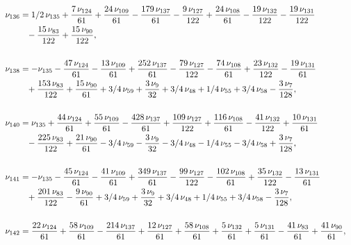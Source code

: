 \documentclass[a4paper,12pt, DIV=14, BCOR=5mm, twoside, headsepline, numbers=noenddot]{scrbook}
\begin{document}
\begin{align}
\begin{aligned}
\\
\nu_{{136}}&=1/2\,\nu_{{135}}+{
\frac {7\,\nu_{{124}}}{61}}+{\frac {24\,\nu_{{109}}}{61}}-{\frac {179
\,\nu_{{137}}}{61}}-{\frac {9\,\nu_{{127}}}{122}}+{\frac {24\,\nu_{{
108}}}{61}}-{\frac {19\,\nu_{{132}}}{122}}-{\frac {19\,\nu_{{131}}}{
122}}\\
 &\hphantom{=}-{\frac {15\,\nu_{{83}}}{122}}+{\frac {15\,\nu_{{90}}}{122}}, \\
\\
\nu_
{{138}}&=-\nu_{{135}}-{\frac {47\,\nu_{{124}}}{61}}-{\frac {13\,\nu_{{
109}}}{61}}+{\frac {252\,\nu_{{137}}}{61}}-{\frac {79\,\nu_{{127}}}{
122}}-{\frac {74\,\nu_{{108}}}{61}}+{\frac {23\,\nu_{{132}}}{122}}-{
\frac {19\,\nu_{{131}}}{61}}\\
 &\hphantom{=}+{\frac {153\,\nu_{{83}}}{122}}+{\frac {15
\,\nu_{{90}}}{61}}+3/4\,\nu_{{59}}+{\frac {3\,\nu_{{9}}}{32}}+3/4\,\nu
_{{48}}+1/4\,\nu_{{55}}+3/4\,\nu_{{58}}-{\frac {3\,\nu_{{7}}}{128}},\\
\\
\nu_{{140}}&=\nu_{{135}}+{\frac {44\,\nu_{{124}}}{61}}+{\frac {55\,\nu_
{{109}}}{61}}-{\frac {428\,\nu_{{137}}}{61}}+{\frac {109\,\nu_{{127}}
}{122}}+{\frac {116\,\nu_{{108}}}{61}}-{\frac {41\,\nu_{{132}}}{122}}+
{\frac {10\,\nu_{{131}}}{61}}\\
 &\hphantom{=}-{\frac {225\,\nu_{{83}}}{122}}+{\frac {
21\,\nu_{{90}}}{61}}-3/4\,\nu_{{59}}-{\frac {3\,\nu_{{9}}}{32}}-3/4\,
\nu_{{48}}-1/4\,\nu_{{55}}-3/4\,\nu_{{58}}+{\frac {3\,\nu_{{7}}}{128}},\\
\\
\nu_{{141}}&=-\nu_{{135}}-{\frac {45\,\nu_{{124}}}{61}}-{\frac {41\,
\nu_{{109}}}{61}}+{\frac {349\,\nu_{{137}}}{61}}-{\frac {99\,\nu_{{127
}}}{122}}-{\frac {102\,\nu_{{108}}}{61}}+{\frac {35\,\nu_{{132}}}{122}
}-{\frac {13\,\nu_{{131}}}{61}}\\
 &\hphantom{=}+{\frac {201\,\nu_{{83}}}{122}}-{\frac 
{9\,\nu_{{90}}}{61}}+3/4\,\nu_{{59}}+{\frac {3\,\nu_{{9}}}{32}}+3/4\,
\nu_{{48}}+1/4\,\nu_{{55}}+3/4\,\nu_{{58}}-{\frac {3\,\nu_{{7}}}{128}},\\
\\
\nu_{{142}}&={\frac {22\,\nu_{{124}}}{61}}+{\frac {58\,\nu_{{109}}}{61
}}-{\frac {214\,\nu_{{137}}}{61}}+{\frac {12\,\nu_{{127}}}{61}}+{
\frac {58\,\nu_{{108}}}{61}}+{\frac {5\,\nu_{{132}}}{61}}+{\frac {5\,
\nu_{{131}}}{61}}-{\frac {41\,\nu_{{83}}}{61}}+{\frac {41\,\nu_{{90}}
}{61}}, 
\end{aligned}
\end{align}
\end{document}
